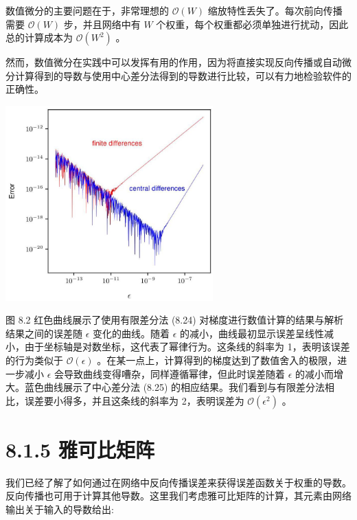 \documentclass[10pt]{report}
\begin{document}
数值微分的主要问题在于，非常理想的 \(\mathcal{O}\left( W\right)\) 缩放特性丢失了。每次前向传播需要 \(\mathcal{O}\left( W\right)\) 步，并且网络中有 \(W\) 个权重，每个权重都必须单独进行扰动，因此总的计算成本为 \(\mathcal{O}\left( {W}^{2}\right)\) 。

然而，数值微分在实践中可以发挥有用的作用，因为将直接实现反向传播或自动微分计算得到的导数与使用中心差分法得到的导数进行比较，可以有力地检验软件的正确性。

\begin{center}
\includegraphics[max width=0.6\textwidth]{images/0194e279-9b28-703a-88f4-c3ac21e2010d_259_732_344_821_770_0.jpg}
\end{center}
\hspace*{3em} 

图 8.2 红色曲线展示了使用有限差分法 (8.24) 对梯度进行数值计算的结果与解析结果之间的误差随 \(\epsilon\) 变化的曲线。随着 \(\epsilon\) 的减小，曲线最初显示误差呈线性减小，由于坐标轴是对数坐标，这代表了幂律行为。这条线的斜率为 1，表明该误差的行为类似于 \(\mathcal{O}\left( \epsilon \right)\) 。在某一点上，计算得到的梯度达到了数值舍入的极限，进一步减小 \(\epsilon\) 会导致曲线变得嘈杂，同样遵循幂律，但此时误差随着 \(\epsilon\) 的减小而增大。蓝色曲线展示了中心差分法 (8.25) 的相应结果。我们看到与有限差分法相比，误差要小得多，并且这条线的斜率为 2，表明误差为 \(\mathcal{O}\left( {\epsilon }^{2}\right)\) 。

\section*{8.1.5 雅可比矩阵}

我们已经了解了如何通过在网络中反向传播误差来获得误差函数关于权重的导数。反向传播也可用于计算其他导数。这里我们考虑雅可比矩阵的计算，其元素由网络输出关于输入的导数给出:
\end{document}
